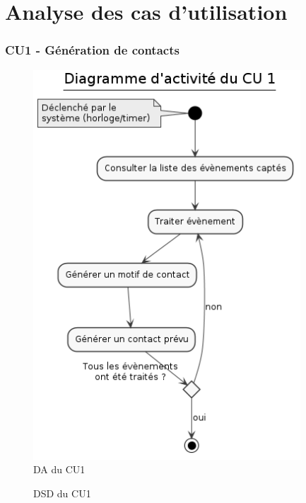 \part{Analyse des cas d'utilisation}
\setcounter{section}{0}

\section{CU1 - Génération de contacts}

\begin{figure}[H]
\centering
\includegraphics[width=10cm]{figures/DA_CU1.png}
\caption{DA du CU1}
\end{figure}

\begin{figure}[H]
\noindent{}
\caption{DSD du CU1}
\end{figure}

